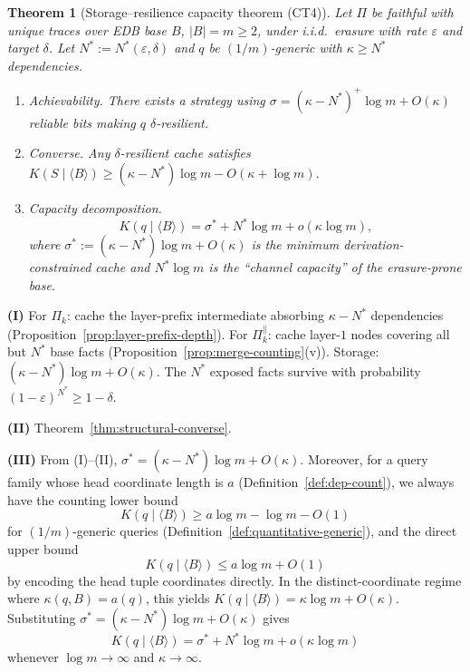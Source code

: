 \documentclass[journal]{IEEEtran}
\makeatletter
\newtheorem{theorem}{Theorem}[section]
\numberwithin{equation}{section}
\renewenvironment{proof}[1][\proofname]{\par
  \pushQED{\qed}%
  \normalfont \topsep6\p@\@plus6\p@\relax
  \trivlist
  \item[\hskip\labelsep
        \itshape
    #1\@addpunct{.}]\ignorespaces
}{%
  \popQED\endtrivlist\@endpefalse
}
\makeatother
\begin{document}
\begin{theorem}[Storage--resilience capacity theorem
  \textup{(CT4)}]
\label{thm:storage-resilience-capacity}
Let $\Pi$ be faithful with unique traces over EDB base $B$,
$|B|=m\ge 2$, under i.i.d.\ erasure with rate $\varepsilon$
and target $\delta$.
Let $N^*:=N^*(\varepsilon,\delta)$ and $q$ be
$(1/m)$-generic with $\kappa\ge N^*$ dependencies.

\begin{enumerate}[label=\textup{(\Roman*)}]
\item \emph{Achievability.}
There exists a strategy using
$\sigma=(\kappa-N^*)^+\log m+O(\kappa)$
reliable bits making $q$ $\delta$-resilient.

\item \emph{Converse.}
Any $\delta$-resilient cache satisfies
$K(S\mid\langle B\rangle)
 \ge(\kappa-N^*)\log m-O(\kappa+\log m)$.

\item \emph{Capacity decomposition.}
\begin{equation}\label{eq:capacity-decomposition}
  K(q\mid\langle B\rangle)
  =\sigma^*+N^*\log m+o(\kappa\log m),
\end{equation}
where $\sigma^*:=(\kappa-N^*)\log m+O(\kappa)$ is the
minimum derivation-constrained cache and $N^*\log m$ is
the ``channel capacity'' of the erasure-prone base.
\end{enumerate}
\end{theorem}

\begin{proof}
\textbf{(I)}
For $\Pi_k$: cache the layer-prefix intermediate absorbing
$\kappa-N^*$ dependencies
(Proposition~\ref{prop:layer-prefix-depth}).
For $\Pi_k^{\parallel}$: cache layer-$1$ nodes covering all
but $N^*$ base facts
(Proposition~\ref{prop:merge-counting}(v)).
Storage: $(\kappa-N^*)\log m+O(\kappa)$.
The $N^*$ exposed facts survive with probability
$(1{-}\varepsilon)^{N^*}\ge 1{-}\delta$.

\textbf{(II)}
Theorem~\ref{thm:structural-converse}.

\textbf{(III)}
From (I)--(II), \(\sigma^*=(\kappa-N^*)\log m+O(\kappa)\).
Moreover, for a query family whose head coordinate length is \(a\) (Definition~\ref{def:dep-count}),
we always have the counting lower bound
\[
  K(q\mid\langle B\rangle)\ge a\log m-\log m-O(1)
\]
for \((1/m)\)-generic queries (Definition~\ref{def:quantitative-generic}),
and the direct upper bound
\[
  K(q\mid\langle B\rangle)\le a\log m+O(1)
\]
by encoding the head tuple coordinates directly.
In the distinct-coordinate regime where \(\kappa(q,B)=a(q)\), this yields
\(K(q\mid\langle B\rangle)=\kappa\log m+O(\kappa)\).
Substituting \(\sigma^*=(\kappa-N^*)\log m+O(\kappa)\) gives
\[
  K(q\mid\langle B\rangle)
  =\sigma^*+N^*\log m+o(\kappa\log m)
\]
whenever \(\log m\to\infty\) and \(\kappa\to\infty\).
\end{proof}
\end{document}
